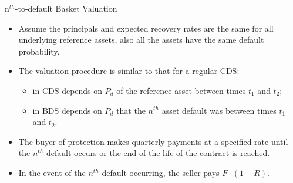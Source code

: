 \documentclass{beamer}
\begin{document}
\begin{frame}{n$^{th}$-to-default Basket Valuation}
  \begin{itemize}
  \item Assume the principals and expected recovery rates are the same for all underlying reference assets, also all the assets have the same default probability.
  \item The valuation procedure is similar to that for a regular CDS:
    \begin{itemize}
    \item in CDS depends on $P_d$ of the reference asset between times $t_1$ and $t_2$;
    \item in BDS depends on $P_d$ that the $n^{th}$ asset default was between times $t_1$ and $t_2$.
    \end{itemize}
  \item The buyer of protection makes quarterly payments at a specified rate until the $n^{th}$ default occurs or the end of the life of the contract is reached. 
  \item In the event of the $n^{th}$ default occurring, the seller pays $F\cdot(1-R)$.
  \end{itemize}
\end{frame}
\end{document}
